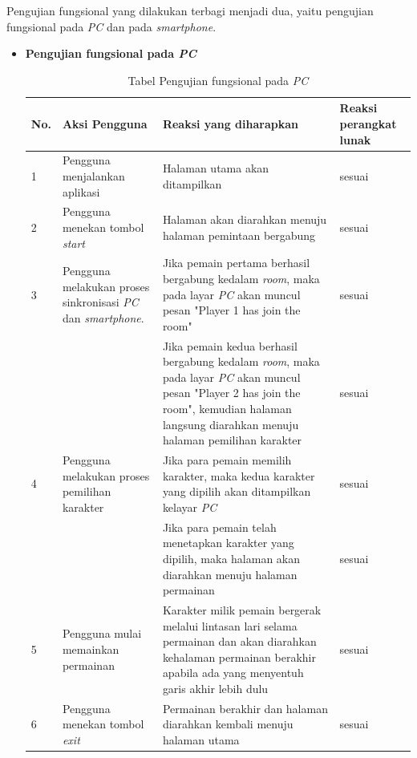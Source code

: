 Pengujian fungsional yang dilakukan terbagi menjadi dua, yaitu pengujian fungsional pada \textit{PC} dan pada \textit{smartphone}.
\begin{itemize}
	\item \textbf{Pengujian fungsional pada \textit{PC}}
\begin{table}[H]
	\centering
	\caption{Tabel Pengujian fungsional pada \textit{PC}}
	\begin{tabular}{|p{0.35cm}| p{3.5cm}| p{7cm}| p{2.5cm}|} \hline
		No. & Aksi Pengguna & Reaksi yang diharapkan & Reaksi perangkat lunak \\ \hline
		1 & Pengguna menjalankan aplikasi & Halaman utama akan ditampilkan & sesuai \\ \hline
		2 & Pengguna menekan tombol \textit{start} & Halaman akan diarahkan menuju halaman pemintaan bergabung & sesuai \\ \hline
		3 & Pengguna melakukan proses sinkronisasi \textit{PC} dan \textit{smartphone}. & Jika pemain pertama berhasil bergabung kedalam \textit{room}, maka pada layar \textit{PC} akan muncul pesan "Player 1 has join the room" & sesuai \\ \hline
		&  & Jika pemain kedua berhasil bergabung kedalam \textit{room}, maka pada layar \textit{PC} akan muncul pesan "Player 2 has join the room", kemudian halaman langsung diarahkan menuju halaman pemilihan karakter & sesuai \\ \hline
		4 & Pengguna melakukan proses pemilihan karakter & Jika para pemain memilih karakter, maka kedua karakter yang dipilih akan ditampilkan kelayar \textit{PC} & sesuai \\ \hline
		&  & Jika para pemain telah menetapkan karakter yang dipilih, maka halaman akan diarahkan menuju halaman permainan & sesuai \\ \hline
		5 & Pengguna mulai memainkan permainan & Karakter milik pemain bergerak melalui lintasan lari selama permainan dan akan diarahkan kehalaman permainan berakhir apabila ada yang menyentuh garis akhir lebih dulu & sesuai \\ \hline
		6 & Pengguna menekan tombol \textit{exit} & Permainan berakhir dan halaman diarahkan kembali menuju halaman utama & sesuai \\ \hline
	\end{tabular}
	\label{table:fungsionalPC}
\end{table}
	

\end{itemize}
